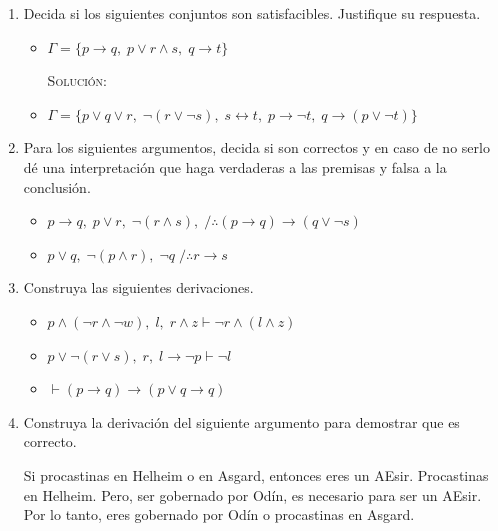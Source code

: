 \documentclass[letterpaper,11pt]{article}
\begin{document}
\begin{enumerate}
    \item Decida si los siguientes conjuntos son satisfacibles. Justifique 
    su respuesta.

    \begin{itemize}
        \item $\Gamma = \{p → q, \; p \lor r \land s, \; q → t\}$

        \textsc{Solución:} 
        \item $\Gamma = \{p \lor q \lor r, \; \neg (r \lor \neg s), \; s ↔ t, \;
                          p → \neg t, \; q → (p \lor \neg t)\}$        
    \end{itemize}

    \item Para los siguientes argumentos, decida si son correctos y en caso de 
    no serlo dé una interpretación que haga verdaderas a las premisas y falsa 
    a la conclusión.

    \begin{itemize}
        \item $p → q, \; p \lor r, \; \neg (r \land s), \; /∴ (p → q) → 
               (q \lor \neg s)$
        \item $p \lor q, \; \neg (p \land r), \; \neg q \; /∴ r → s$
    \end{itemize}

    \item Construya las siguientes derivaciones.

    \begin{itemize}
        \item $p \land (\neg r \land \neg w), \; l, \; r \land z ⊢ \neg r 
               \land (l \land z)$
        \item $p \lor \neg(r \lor s), \; r, \; l → \neg p ⊢ \neg l$
        \item $⊢(p → q) → (p \lor q → q)$
    \end{itemize}

    \item Construya la derivación del siguiente argumento para demostrar que es 
    correcto.

    Si procastinas en Helheim o en Asgard, entonces eres un AEsir. Procastinas 
    en Helheim. Pero, ser gobernado por Odín, es necesario para ser un AEsir. 
    Por lo tanto, eres gobernado por Odín o procastinas en Asgard.


\end{enumerate}
\end{document}
